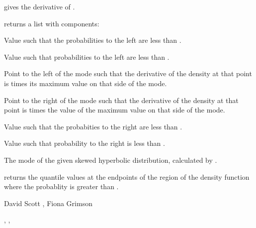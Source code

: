 \documentclass{book}
\begin{document}
\begin{Value}
 gives the derivative of .

 returns a list with components:
\begin{ldescription}
\item[\code{xTiny}] Value such that the probabilities to the left are less
than .
\item[\code{xSmall}] Value such that probabilities to the left are less
than .
\item[\code{lowBreak}] Point to the left of the mode such that the
derivative of the density at that point is  times its
maximum value on that side of the mode.
\item[\code{highBreak}] Point to the right of the mode such that the derivative
of the density at that point is  times the value of the
maximum value on that side of the mode.
\item[\code{xLarge}] Value such that the probabities to the right are less than
.
\item[\code{xHuge}] Value such that probability to the right is less than
.
\item[\code{modeDist}] The mode of the given skewed hyperbolic distribution,
calculated by .
\end{ldescription}


 returns the quantile values at the
endpoints of the region of the density function where the probablity
is greater than .
\end{Value}
\begin{Author}\relax
David Scott , Fiona Grimson
\end{Author}
\begin{SeeAlso}\relax
{}, , 
\end{SeeAlso}
\end{document}
